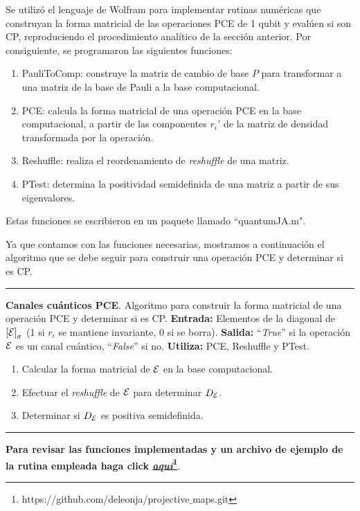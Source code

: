 Se utilizó el lenguaje de Wolfram para implementar 
rutinas numéricas que construyan la forma matricial 
de las operaciones PCE de 1 qubit y evalúen si son CP,
reproduciendo el procedimiento analítico de la sección anterior. 
Por consiguiente, se programaron las siguientes funciones:
\begin{enumerate}
\item PauliToComp: construye la matriz de cambio de base $P$
para transformar a una matriz de la base de Pauli
a la base computacional.
\item PCE: calcula la forma matricial de una operación PCE en la
base computacional, a partir de las componentes $r_i'$ 
de la matriz de densidad transformada por la operación.
\item Reshuffle: realiza el reordenamiento de \textit{reshuffle} de una matriz.
\item PTest: determina la positividad semidefinida de una matriz 
a partir de sus eigenvalores.
\end{enumerate}
Estas funciones se escribieron en un paquete llamado ``quantumJA.m".

Ya que contamos con las funciones necesarias, mostramos
a continuación el algoritmo que se debe seguir para construir 
una operación PCE y determinar si es CP.

\vspace{1em} \hrule \vspace{1em}
\textbf{Canales cuánticos PCE}.
Algoritmo para construir la forma matricial de una operación 
PCE y determinar si es CP.
\textbf{Entrada:} Elementos de la diagonal de $\qty[\mathcal{E}]_{\sigma}$
(1 si $r_i$ se mantiene invariante, 0 si se borra). 
\textbf{Salida:} ``\textit{True}'' si la operación $\mathcal{E}$ es un canal cuántico,
``\textit{False}'' si no.
\textbf{Utiliza:} PCE, Reshuffle y PTest.
\begin{enumerate}
\item Calcular la forma matricial de $\mathcal{E}$ en la base computacional.
\item Efectuar el \textit{reshuffle} de $\mathcal{E}$ para determinar $D_{\mathcal{E}}$.
\item Determinar si $D_{\mathcal{E}}$ es positiva semidefinida.
\end{enumerate}
\hrule \vspace{1em}

\textbf{Para revisar las funciones implementadas y 
un archivo de ejemplo de la rutina empleada haga click 
\href{https://github.com/deleonja/projective_maps.git}
{\textit{aquí}}\footnote{
https://github.com/deleonja/projective$\_$maps.git}}.

